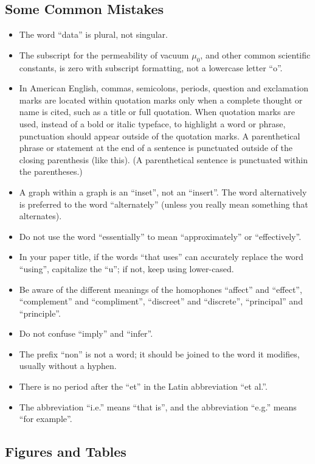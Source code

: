 \documentclass[conference]{IEEEtran}
\begin{document}
\subsection{Some Common Mistakes}\label{SCM}
\begin{itemize}
\item The word ``data'' is plural, not singular.
\item The subscript for the permeability of vacuum $\mu_{0}$, and other common scientific constants, is zero with subscript formatting, not a lowercase letter ``o''.
\item In American English, commas, semicolons, periods, question and exclamation marks are located within quotation marks only when a complete thought or name is cited, such as a title or full quotation. When quotation marks are used, instead of a bold or italic typeface, to highlight a word or phrase, punctuation should appear outside of the quotation marks. A parenthetical phrase or statement at the end of a sentence is punctuated outside of the closing parenthesis (like this). (A parenthetical sentence is punctuated within the parentheses.)
\item A graph within a graph is an ``inset'', not an ``insert''. The word alternatively is preferred to the word ``alternately'' (unless you really mean something that alternates).
\item Do not use the word ``essentially'' to mean ``approximately'' or ``effectively''.
\item In your paper title, if the words ``that uses'' can accurately replace the word ``using'', capitalize the ``u''; if not, keep using lower-cased.
\item Be aware of the different meanings of the homophones ``affect'' and ``effect'', ``complement'' and ``compliment'', ``discreet'' and ``discrete'', ``principal'' and ``principle''.
\item Do not confuse ``imply'' and ``infer''.
\item The prefix ``non'' is not a word; it should be joined to the word it modifies, usually without a hyphen.
\item There is no period after the ``et'' in the Latin abbreviation ``et al.''.
\item The abbreviation ``i.e.'' means ``that is'', and the abbreviation ``e.g.'' means ``for example''.
\end{itemize}

\subsection{Figures and Tables}
\end{document}

